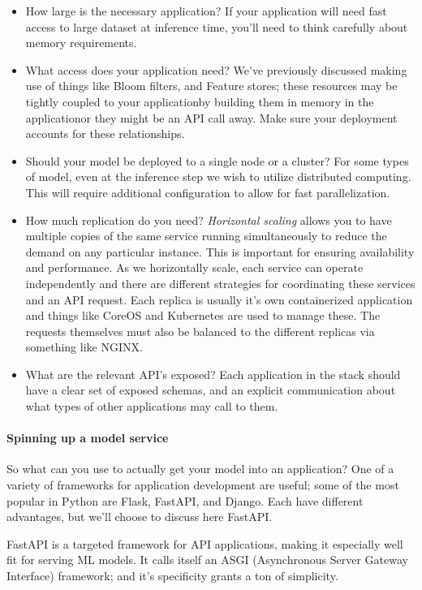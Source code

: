 \begin{itemize}
\item How large is the necessary application? If your application will need fast access to large dataset at inference time, you'll need to think carefully about memory requirements.
\item What access does your application need? We've previously discussed making use of things like Bloom filters, and Feature stores; these resources may be tightly coupled to your application\textemdash by building them in memory in the application\textemdash or they might be an API call away. Make sure your deployment accounts for these relationships.
\item Should your model be deployed to a single node or a cluster? For some types of model, even at the inference step we wish to utilize distributed computing. This will require additional configuration to allow for fast parallelization.
\item How much replication do you need? \emph{Horizontal scaling} allows you to have multiple copies of the same service running simultaneously to reduce the demand on any particular instance. This is important for ensuring availability and performance. As we horizontally scale, each service can operate independently and there are different strategies for coordinating these services and an API request. Each replica is usually it's own containerized application and things like CoreOS and Kubernetes are used to manage these. The requests themselves must also be balanced to the different replicas via something like NGINX.
\item What are the relevant API's exposed? Each application in the stack should have a clear set of exposed schemas, and an explicit communication about what types of other applications may call to them.
\end{itemize}

\paragraph{Spinning up a model service}

So what can you use to actually get your model into an application? One of a variety of frameworks for application development are useful; some of the most popular in Python are Flask, FastAPI, and Django. Each have different advantages, but we'll choose to discuss here FastAPI. 

FastAPI is a targeted framework for API applications, making it especially well fit for serving ML models. It calls itself an ASGI (Asynchronous Server Gateway Interface) framework; and it's specificity grants a ton of simplicity. 

